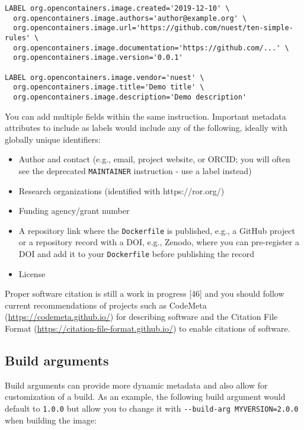 \documentclass[10pt,letterpaper]{article}
\providecommand{\tightlist}{%
  \setlength{\itemsep}{0pt}\setlength{\parskip}{0pt}}
\begin{document}
\begin{verbatim}
LABEL org.opencontainers.image.created='2019-12-10' \
  org.opencontainers.image.authors='author@example.org' \
  org.opencontainers.image.url='https://github.com/nuest/ten-simple-rules' \
  org.opencontainers.image.documentation='https://github.com/...' \
  org.opencontainers.image.version='0.0.1'

LABEL org.opencontainers.image.vendor='nuest' \
  org.opencontainers.image.title='Demo title' \
  org.opencontainers.image.description='Demo description'
\end{verbatim}

You can add multiple fields within the same instruction. Important
metadata attributes to include as labels would include any of the
following, ideally with globally unique identifiers:

\begin{itemize}
\tightlist
\item
  Author and contact (e.g., email, project website, or ORCID; you will
  often see the deprecated \texttt{MAINTAINER} instruction - use a label
  instead)
\item
  Research organizations (identified with https://ror.org/)
\item
  Funding agency/grant number
\item
  A repository link where the \texttt{Dockerfile} is published, e.g., a
  GitHub project or a repository record with a DOI, e.g., Zenodo, where
  you can pre-register a DOI and add it to your \texttt{Dockerfile}
  before publishing the record
\item
  License
\end{itemize}

Proper software citation is still a work in progress {[}46{]} and you
should follow current recommendations of projects such as CodeMeta
(\url{https://codemeta.github.io/}) for describing software and the
Citation File Format (\url{https://citation-file-format.github.io/}) to
enable citations of software.

\hypertarget{build-arguments}{%
\subsection{Build arguments}\label{build-arguments}}

Build arguments can provide more dynamic metadata and also allow for
customization of a build. As an example, the following build argument
would default to \texttt{1.0.0} but allow you to change it with
\texttt{-\/-build-arg\ MYVERSION=2.0.0} when building the image:
\end{document}
